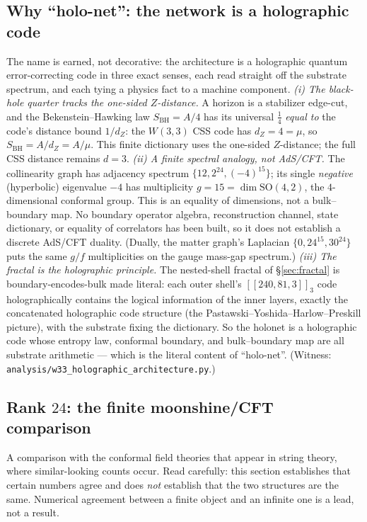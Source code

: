 \documentclass[11pt]{article}
\begin{document}
\subsection{Why ``holo-net'': the network is a holographic code}
\label{sec:holographic-code}

The name is earned, not decorative: the architecture is a holographic
quantum error-correcting code in three exact senses, each read straight off the
substrate spectrum, and each tying a physics fact to a machine component.
\emph{(i) The black-hole quarter tracks the one-sided $Z$-distance.} A horizon is a stabilizer
edge-cut, and the Bekenstein--Hawking law $S_{\mathrm{BH}}=A/4$ has its universal
$\tfrac14$ \emph{equal to} the code's distance bound $1/d_Z$: the $W(3,3)$ CSS
code has $d_Z=4=\mu$, so $S_{\mathrm{BH}}=A/d_Z=A/\mu$. This finite dictionary
uses the one-sided $Z$-distance; the full CSS distance remains $d=3$.
\emph{(ii) A finite spectral analogy, not AdS/CFT.} The collinearity graph has adjacency spectrum
$\{12,2^{24},(-4)^{15}\}$; its single \emph{negative} (hyperbolic) eigenvalue
$-4$ has multiplicity $g=15=\dim\mathrm{SO}(4,2)$, the $4$-dimensional conformal
group. This is an equality of dimensions, not a bulk--boundary map.  No boundary
operator algebra, reconstruction channel, state dictionary, or equality of
correlators has been built, so it does not establish a discrete AdS/CFT
duality. (Dually, the
matter graph's Laplacian $\{0,24^{15},30^{24}\}$ puts the same $g/f$
multiplicities on the gauge mass-gap spectrum.)
\emph{(iii) The fractal is the holographic principle.} The nested-shell fractal
of \S\ref{sec:fractal} is boundary-encodes-bulk made literal: each outer shell's
$[[240,81,3]]_3$ code holographically contains the logical information of the
inner layers, exactly the concatenated holographic code structure (the
Pastawski--Yoshida--Harlow--Preskill picture), with the substrate fixing the
dictionary. So the holonet is a holographic code whose entropy law, conformal
boundary, and bulk--boundary map are all substrate arithmetic --- which is the
literal content of ``holo-net''. (Witness:
\texttt{analysis/w33\_holographic\_architecture.py}.)

\subsection{Rank $24$: the finite moonshine/CFT comparison}

\begin{plainbox}
A comparison with the conformal field theories that appear in string theory, where
similar-looking counts occur. Read carefully: this section establishes that certain numbers
agree and does \emph{not} establish that the two structures are the same. Numerical
agreement between a finite object and an infinite one is a lead, not a result.
\end{plainbox}
\end{document}

